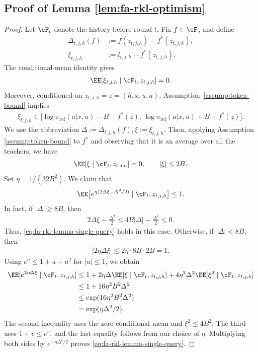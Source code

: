 \documentclass[11pt]{article}
\newcommand{\piref}{\pi_{\text{ref}}}
\begin{document}
\subsection{Proof of Lemma \ref{lem:fa-rkl-optimism}}
\begin{proof}
Let $\cF_t$ denote the history before round $t$.
Fix $f\in\cF$, and define
\begin{align*}
    \Delta_{t,j,h}(f)
    &:=
    f(z_{t,j,h})-f^*(z_{t,j,h}),\\
    \xi_{t,j,h}
    &:=
    l_{t,j,h}-f^*(z_{t,j,h}).
\end{align*}
The conditional-mean identity gives
\begin{align}
    \EE[\xi_{t,j,h}\mid\cF_t,z_{t,j,h}]
    =0.
    \label{eq:fa-rkl-lemma-centered-noise}
\end{align}
Moreover, conditioned on
$z_{t,j,h}=z=(h,x,u,a)$,
Assumption~\ref{assump:token-bound} implies
\begin{align*}
    \xi_{t,j,h}
    \in
    \big[
        \log\piref(a|x,u)-B-f^*(z),\,
        \log\piref(a|x,u)+B-f^*(z)
    \big].
\end{align*}
We use the abbreviation $\Delta:=\Delta_{t,j,h}(f),    \xi:=\xi_{t,j,h}$. Then, applying Assumption \ref{assump:token-bound} to $f^*$ and observing that it is an average over all the teachers, we have
\begin{align*}
    \EE[\xi\mid\cF_t,z_{t,j,h}]=0,
    \qquad
    |\xi|\leq2B.
\end{align*}
Set $\eta=1/(32B^2)$. 
We claim that
\begin{align}
    \EE\big[
        e^{\eta(2\Delta\xi-\Delta^2/2)}
        \mid\cF_t,z_{t,j,h}
    \big]
    \leq1.
    \label{eq:fa-rkl-lemma-single-query}
\end{align}
In fact, if $|\Delta|\geq8B$, then
\begin{align*}
    2\Delta\xi-\frac{\Delta^2}{2}
    \leq
    4B|\Delta|-\frac{\Delta^2}{2}
    \leq0.
\end{align*}
Thus, \eqref{eq:fa-rkl-lemma-single-query} holds in this case. Otherwise, if $|\Delta|<8B$, then
\begin{align*}
    |2\eta\Delta\xi|
    \leq
    2\eta\cdot8B\cdot2B
    =1.
\end{align*}
Using $e^u\leq1+u+u^2$ for $|u|\leq1$,
we obtain
\begin{align*}
    \EE[e^{2\eta\Delta\xi}\mid\cF_t,z_{t,j,h}]
    &\leq
    1+
    2\eta\Delta
    \EE[\xi\mid\cF_t,z_{t,j,h}]
    +
    4\eta^2\Delta^2
    \EE[\xi^2\mid\cF_t,z_{t,j,h}]\\
    &\leq
    1+16\eta^2B^2\Delta^2\\
    &\leq
    \exp(16\eta^2B^2\Delta^2)\\
    &=
    \exp(\eta\Delta^2/2).
\end{align*}
The second inequality uses the zero conditional mean
and $\xi^2\leq4B^2$.
The third uses $1+v\leq e^v$, and the last equality
follows from our choice of $\eta$.
Multiplying both sides by $e^{-\eta\Delta^2/2}$
proves \eqref{eq:fa-rkl-lemma-single-query}.


\end{proof}
\end{document}
